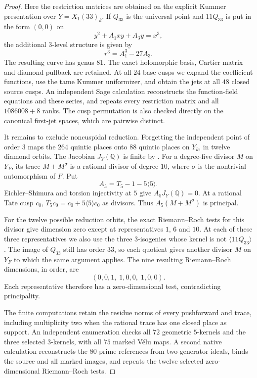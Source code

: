 \begin{proof}
Here the restriction matrices are obtained on the explicit
Kummer presentation over $Y=X_1(33)_k$. If $Q_{33}$ is the
universal point and $11Q_{33}$ is put in the form
$(0,0)$ on
\[
                       y^2+A_1xy+A_3y=x^3,
\]
the additional $3$-level structure is given by
\[
                              r^3=A_1^3-27A_3.
\]
The resulting curve has genus $81$. The exact holomorphic basis,
Cartier matrix and diamond pullback are retained. At all $24$
base cusps we expand the coefficient functions, use the tame
Kummer uniformizer, and obtain the jets at all $48$ closed
source cusps. An independent Sage calculation reconstructs
the function-field equations and these series, and repeats
every restriction matrix and all $1086008+8$ ranks.
The cusp permutation is also checked directly on the canonical
first-jet spaces, which are pairwise distinct.

It remains to exclude noncuspidal reduction. Forgetting the
independent point of order $3$ maps the $264$ quintic places
onto $88$ quintic places on $Y_k$, in twelve diamond orbits.
The Jacobian $J_Y(\mathbb Q)$ is finite by
\cite[Theorem~3.1]{DEHMZ}. For a degree-five divisor $M$ on
$Y_F$, its trace $M+M^\sigma$ is a rational divisor of degree
$10$, where $\sigma$ is the nontrivial automorphism of $F$.
Put
\[
                  A_5=T_5-1-5\langle5\rangle.
\]
Eichler--Shimura and torsion injectivity at $5$ give
$A_5J_Y(\mathbb Q)=0$. At a rational Tate cusp $c_0$,
$T_5c_0=c_0+5\langle5\rangle c_0$ as divisors.
Thus $A_5(M+M^\sigma)$ is principal.

For the twelve possible reduction orbits, the exact
Riemann--Roch tests for this divisor give dimension zero
except at representatives $1$, $6$ and $10$.
At each of these three representatives we also use the three
$3$-isogenies whose kernel is not $\langle11Q_{33}\rangle$.
The image of $Q_{33}$ still has order $33$, so each quotient
gives another divisor $M$ on $Y_F$ to which the same argument
applies. The nine resulting Riemann--Roch dimensions, in order,
are
\[
                       (0,0,1,\;1,0,0,\;1,0,0).
\]
Each representative therefore has a zero-dimensional test,
contradicting principality.

The finite computations retain the residue norms of every
pushforward and trace, including multiplicity two when the
rational trace has one closed place as support.
An independent enumeration checks all $72$ geometric
$5$-kernels and the three selected $3$-kernels, with all $75$
marked V\'elu maps. A second native calculation reconstructs
the $80$ prime references from two-generator ideals, binds
the source and all marked images, and repeats the twelve
selected zero-dimensional Riemann--Roch tests.
\end{proof}
